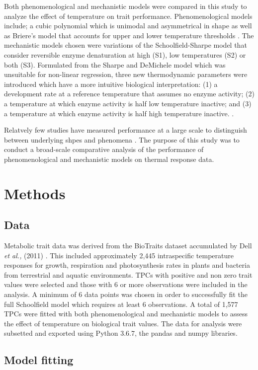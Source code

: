 \documentclass[12pt]{article}
\begin{document}
\begin{linenumbers}
Both phenomenological and mechanistic models were compared in this study to analyze the effect of temperature on trait performance. Phenomenological models include; a cubic polynomial which is unimodal and asymmetrical in shape as well as Briere's model that accounts for upper and lower temperature thresholds \cite{10.1093/ee/28.1.22}. The mechanistic models chosen were variations of the Schoolfield-Sharpe model that consider  reversible enzyme denaturation at high (S1), low temperatures (S2) or both (S3).
Formulated from the Sharpe and DeMichele model which was unsuitable for non-linear regression, three new thermodynamic parameters were introduced which have a more intuitive biological interpretation: (1) a development rate at a reference temperature that assumes no enzyme activity; (2) a temperature at which enzyme activity is half low temperature inactive; and (3) a temperature at which enzyme activity is half high temperature inactive. \cite{SCHOOLFIELD1981719}.

 Relatvely few studies have measured performance at a large scale to distinguish between underlying shpes and phenomena \cite{pub.1026914980} \cite{Dowd1956}. The purpose of this study was to conduct a broad-scale comparative analysis of the performance of phenomenological and mechanistic models on thermal response data.

 \section{Methods}
 \subsection{Data}
 Metabolic trait data was derived from the BioTraits dataset accumulated by Dell \textit{et al.,} (2011) . This included approximately 2,445 intraspecific temperature responses for growth, respiration and photosynthesis rates in plants and bacteria from terrestrial and aquatic environments. 
 TPCs with positive and non zero trait values were selected and those with 6 or more observations were included in the analysis. A minimum of 6 data points was chosen in order to successfully fit the full Schoolfield model which requires at least 6 observations. A total of 1,577 TPCs were fitted with both phenomenological and mechanistic models to assess the effect of temperature on biological trait values. The data for analysis were subsetted and exported using Python 3.6.7, the pandas and numpy libraries.
 
 \subsection{Model fitting}

\end{linenumbers}
\end{document}
